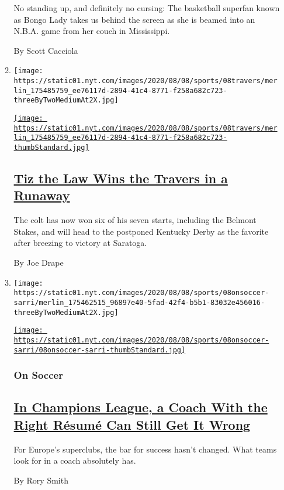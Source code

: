 \begin{enumerate}
\begin{enumerate}
    No standing up, and definitely no cursing: The basketball superfan
    known as Bongo Lady takes us behind the screen as she is beamed into
    an N.B.A. game from her couch in Mississippi.

    By Scott Cacciola
  \item
    \texttt{[image: https://static01.nyt.com/images/2020/08/08/sports/08travers/merlin\_175485759\_ee76117d-2894-41c4-8771-f258a682c723-threeByTwoMediumAt2X.jpg]}

    \href{/2020/08/08/sports/horse-racing/tiz-the-law-travers.html}{\texttt{[image: https://static01.nyt.com/images/2020/08/08/sports/08travers/merlin\_175485759\_ee76117d-2894-41c4-8771-f258a682c723-thumbStandard.jpg]}}

    \hypertarget{tiz-the-law-wins-the-travers-in-a-runaway}{%
    \subsection{\texorpdfstring{\href{/2020/08/08/sports/horse-racing/tiz-the-law-travers.html}{Tiz
    the Law Wins the Travers in a
    Runaway}}{Tiz the Law Wins the Travers in a Runaway}}\label{tiz-the-law-wins-the-travers-in-a-runaway}}

    The colt has now won six of his seven starts, including the Belmont
    Stakes, and will head to the postponed Kentucky Derby as the
    favorite after breezing to victory at Saratoga.

    By Joe Drape
  \item
    \texttt{[image: https://static01.nyt.com/images/2020/08/08/sports/08onsoccer-sarri/merlin\_175462515\_96897e40-5fad-42f4-b5b1-83032e456016-threeByTwoMediumAt2X.jpg]}

    \href{/2020/08/08/sports/soccer/juventus-sarri-champions-league.html}{\texttt{[image: https://static01.nyt.com/images/2020/08/08/sports/08onsoccer-sarri/08onsoccer-sarri-thumbStandard.jpg]}}

    \hypertarget{on-soccer}{%
    \subsubsection{On Soccer}\label{on-soccer}}

    \hypertarget{in-champions-league-a-coach-with-the-right-ruxe9sumuxe9-can-still-get-it-wrong}{%
    \subsection{\texorpdfstring{\href{/2020/08/08/sports/soccer/juventus-sarri-champions-league.html}{In
    Champions League, a Coach With the Right Résumé Can Still Get It
    Wrong}}{In Champions League, a Coach With the Right Résumé Can Still Get It Wrong}}\label{in-champions-league-a-coach-with-the-right-ruxe9sumuxe9-can-still-get-it-wrong}}

    For Europe's superclubs, the bar for success hasn't changed. What
    teams look for in a coach absolutely has.

    By Rory Smith
  \end{enumerate}
\end{enumerate}

